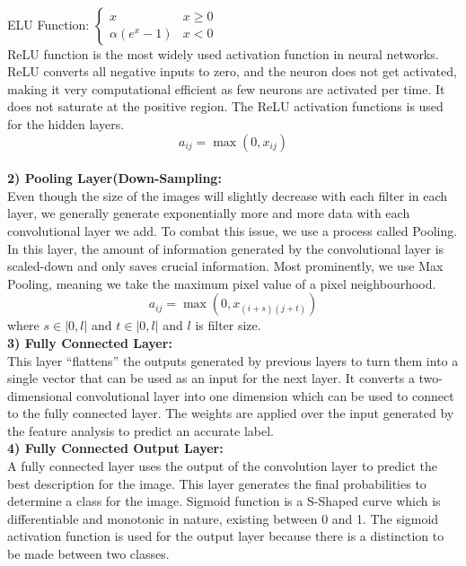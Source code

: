\documentclass[12pt]{revtex4}
\begin{document}
\\ELU Function: $\left\{\begin{array}{ll}
x & x \geq 0 \\
\alpha\left(e^{x}-1\right) & x<0
\end{array}\right.$
\\ReLU function is the most widely used activation function in neural networks. ReLU converts all negative inputs to zero, and the neuron does not get activated, making it very computational efficient as few neurons are activated per time. It does not saturate at the positive region. The ReLU activation functions is used for the hidden layers.
\begin{equation}a_{i j}=\max \left(0, x_{i j}\right)\end{equation}
\\\textbf{2) Pooling Layer(Down-Sampling:}
\\Even though the size of the images will slightly decrease with each filter in each layer, we generally generate exponentially more and more data with each convolutional layer we add. To combat this issue, we use a process called Pooling. In this layer, the amount of information generated by the convolutional layer is scaled-down and only saves crucial information. Most prominently, we use Max Pooling, meaning we take the maximum pixel value of a pixel neighbourhood.
\begin{equation}a_{i j}=\max \left(0, x_{(i+s)(j+t)}\right)\end{equation}
where $s \in|0, l|$ and $t \in|0, l|$ and $l$ is filter size.
\\\textbf{3) Fully Connected Layer:}
\\This layer “flattens” the outputs generated by previous layers to turn them into a single vector that can be used as an input for the next layer. It converts a two-dimensional convolutional layer into one dimension which can be used to connect to the fully connected layer.  The weights are applied over the input generated by the feature analysis to predict an accurate label.
\\\textbf{4) Fully Connected Output Layer:}
\\A fully connected layer uses the output of the convolution layer to predict the best description for the image. This layer generates the final probabilities to determine a class for the image. Sigmoid function is a S-Shaped curve which is differentiable and monotonic in nature, existing between 0 and 1. The sigmoid activation function is used for the output layer because there is a distinction to be made between two classes. 
\end{document}

